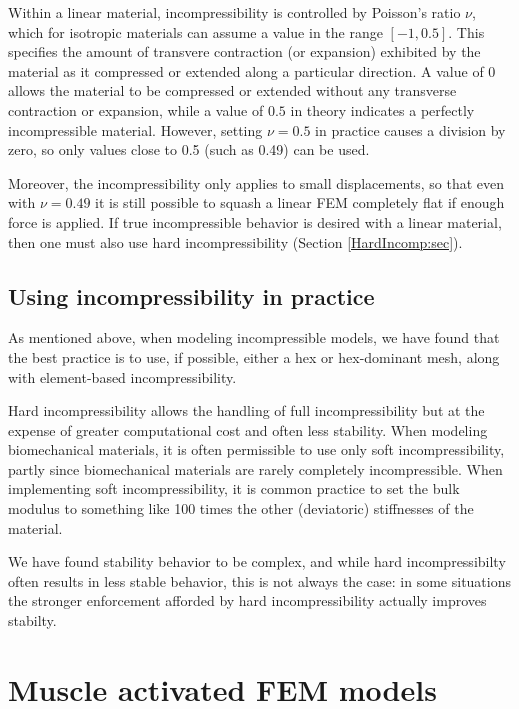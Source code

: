Within a linear material, incompressibility is controlled by Poisson's
ratio $\nu$, which for isotropic materials can assume a value in the
range $[-1, 0.5]$. This specifies the amount of transvere contraction
(or expansion) exhibited by the material as it compressed or extended
along a particular direction. A value of $0$ allows the material to be
compressed or extended without any transverse contraction or
expansion, while a value of $0.5$ in theory indicates a perfectly
incompressible material. However, setting $\nu = 0.5$ in practice
causes a division by zero, so only values close to 0.5 (such as 0.49)
can be used. 

Moreover, the incompressibility only applies to small displacements,
so that even with $\nu = 0.49$ it is still possible to squash a linear
FEM completely flat if enough force is applied. If true incompressible
behavior is desired with a linear material, then one must also use
hard incompressibility (Section \ref{HardIncomp:sec}).

\subsection{Using incompressibility in practice}

As mentioned above, when modeling incompressible models, we have found
that the best practice is to use, if possible, either a hex or
hex-dominant mesh, along with element-based incompressibility.

Hard incompressibility allows the handling of full incompressibility
but at the expense of greater computational cost and often less
stability. When modeling biomechanical materials, it is often
permissible to use only soft incompressibility, partly since
biomechanical materials are rarely completely incompressible.  When
implementing soft incompressibility, it is common practice to set the
bulk modulus to something like 100 times the other (deviatoric)
stiffnesses of the material.

We have found stability behavior to be complex, and while hard
incompressibilty often results in less stable behavior, this is not
always the case: in some situations the stronger enforcement afforded
by hard incompressibility actually improves stabilty.

\section{Muscle activated FEM models}
\label{sec:fem:muscle}

